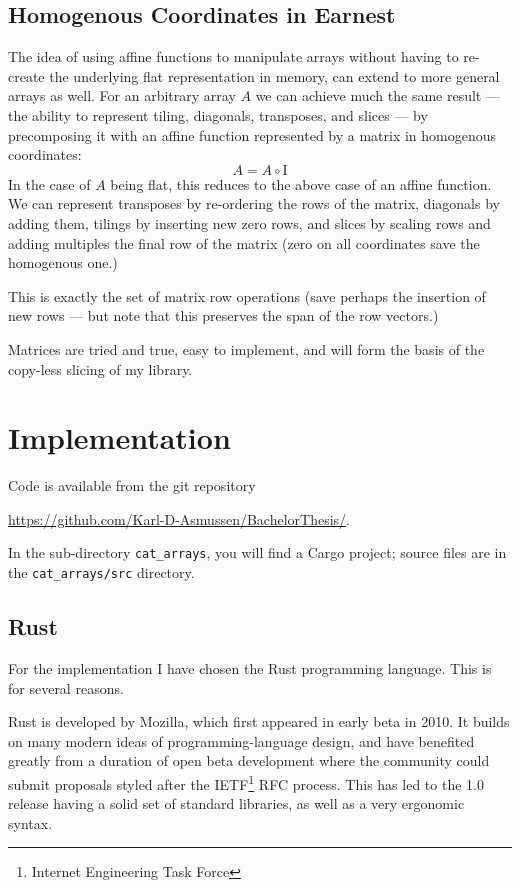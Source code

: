 \documentclass{DIKU-report-variant}
\newcommand\mrm[1]{\mathrm{#1}}
\newcommand\brm[1]{\bm{\mrm{#1}}}
\begin{document}
\section{Homogenous Coordinates in Earnest}

The idea of using affine functions to manipulate arrays without having to re-create the underlying flat
representation in memory, can extend to more general arrays as well. For an arbitrary array \(A\) we can
achieve much the same result --- the ability to represent tiling, diagonals, transposes, and slices ---
by precomposing it with an affine function represented by a matrix in homogenous coordinates:
\[ A = A \circ \brm I \]
In the case of \(A\) being flat, this reduces to the above case of an affine function.
We can represent transposes by re-ordering the rows of the matrix, diagonals by adding them, tilings by
inserting new zero rows, and slices by scaling rows and adding multiples the final row of the matrix (zero
on all coordinates save the homogenous one.)

This is exactly the set of matrix row operations (save perhaps the insertion of new rows --- but note that
this preserves the span of the row vectors.)

Matrices are tried and true, easy to implement, and will form the basis of the copy-less slicing of my library.

\chapter{Implementation}

Code is available from the git repository
\begin{center}
\url{https://github.com/Karl-D-Asmussen/BachelorThesis/}.
\end{center}
In the sub-directory \texttt{cat\_arrays}, you will find a Cargo project;
source files are in the \texttt{cat\_arrays/src} directory.

\section{Rust}

For the implementation I have chosen the Rust programming language. This
is for several reasons.

Rust is developed by Mozilla, which first appeared in early beta in 2010. It
builds on many modern ideas of programming-language design, and have benefited
greatly from a duration of open beta development where the community could submit
proposals styled after the IETF\footnote{Internet Engineering Task Force}
RFC process. This has led to the 1.0 release having a solid set of standard libraries,
as well as a very ergonomic syntax.
\end{document}
